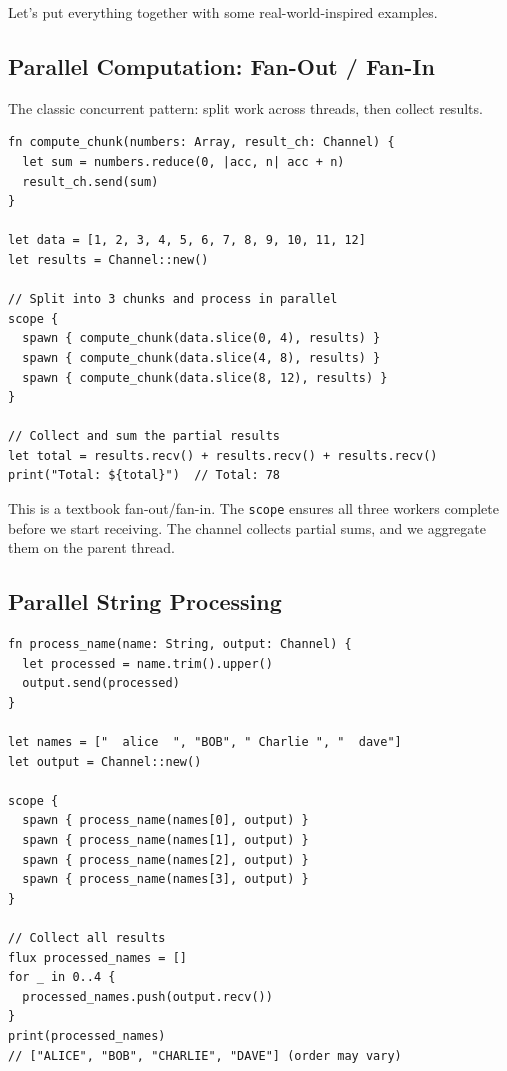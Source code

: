 Let's put everything together with some real-world-inspired examples.

\subsection{Parallel Computation: Fan-Out / Fan-In}\label{subsec:fan-out-fan-in}


The classic concurrent pattern: split work across threads, then collect results.

\begin{lstlisting}[language=Lattice, caption={Fan-out/fan-in with channels}]
fn compute_chunk(numbers: Array, result_ch: Channel) {
  let sum = numbers.reduce(0, |acc, n| acc + n)
  result_ch.send(sum)
}

let data = [1, 2, 3, 4, 5, 6, 7, 8, 9, 10, 11, 12]
let results = Channel::new()

// Split into 3 chunks and process in parallel
scope {
  spawn { compute_chunk(data.slice(0, 4), results) }
  spawn { compute_chunk(data.slice(4, 8), results) }
  spawn { compute_chunk(data.slice(8, 12), results) }
}

// Collect and sum the partial results
let total = results.recv() + results.recv() + results.recv()
print("Total: ${total}")  // Total: 78
\end{lstlisting}

This is a textbook fan-out/fan-in.
The \lstinline|scope| ensures all three workers complete before we start receiving.
The channel collects partial sums, and we aggregate them on the parent thread.

\subsection{Parallel String Processing}

\begin{lstlisting}[language=Lattice, caption={Processing files in parallel}]
fn process_name(name: String, output: Channel) {
  let processed = name.trim().upper()
  output.send(processed)
}

let names = ["  alice  ", "BOB", " Charlie ", "  dave"]
let output = Channel::new()

scope {
  spawn { process_name(names[0], output) }
  spawn { process_name(names[1], output) }
  spawn { process_name(names[2], output) }
  spawn { process_name(names[3], output) }
}

// Collect all results
flux processed_names = []
for _ in 0..4 {
  processed_names.push(output.recv())
}
print(processed_names)
// ["ALICE", "BOB", "CHARLIE", "DAVE"] (order may vary)
\end{lstlisting}

